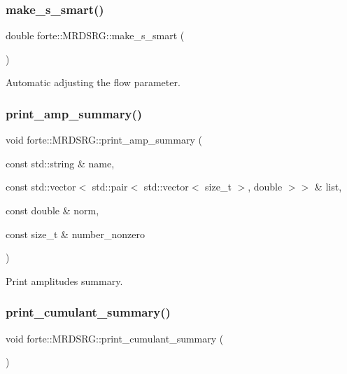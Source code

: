 \subsubsection{\texorpdfstring{make\+\_\+s\+\_\+smart()}{make\_s\_smart()}}
{\footnotesize\ttfamily double forte\+::\+M\+R\+D\+S\+R\+G\+::make\+\_\+s\+\_\+smart (\begin{DoxyParamCaption}{ }\end{DoxyParamCaption})\hspace{0.3cm}{\ttfamily [protected]}}



Automatic adjusting the flow parameter. 

\mbox{\label{classforte_1_1_m_r_d_s_r_g_ab1952878ad3432d39755b2d02dfd6a78}} 
\subsubsection{\texorpdfstring{print\+\_\+amp\+\_\+summary()}{print\_amp\_summary()}}
{\footnotesize\ttfamily void forte\+::\+M\+R\+D\+S\+R\+G\+::print\+\_\+amp\+\_\+summary (\begin{DoxyParamCaption}\item[{const std\+::string \&}]{name,  }\item[{const std\+::vector$<$ std\+::pair$<$ std\+::vector$<$ size\+\_\+t $>$, double $>$$>$ \&}]{list,  }\item[{const double \&}]{norm,  }\item[{const size\+\_\+t \&}]{number\+\_\+nonzero }\end{DoxyParamCaption})\hspace{0.3cm}{\ttfamily [protected]}}



Print amplitudes summary. 

\mbox{\label{classforte_1_1_m_r_d_s_r_g_ad6035163ee50e5e6e4291f8832dfb0a1}} 
\subsubsection{\texorpdfstring{print\+\_\+cumulant\+\_\+summary()}{print\_cumulant\_summary()}}
{\footnotesize\ttfamily void forte\+::\+M\+R\+D\+S\+R\+G\+::print\+\_\+cumulant\+\_\+summary (\begin{DoxyParamCaption}{ }\end{DoxyParamCaption})\hspace{0.3cm}{\ttfamily [protected]}}



